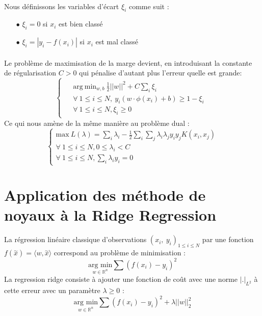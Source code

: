 \documentclass[a4paper,12pt,titlepage]{report}
\begin{document}
\paragraph{}
Nous définissons les variables d'écart $\xi_i$ comme suit :
\begin{itemize}
\item[$\bullet$]  $\xi_i = 0$ si $x_i$ est bien classé	  	  	 
\item[$\bullet$]  $\xi_i = |y_i - f(x_i)|$ si $x_i$ est mal classé	  
\end{itemize}	

\paragraph{}
Le problème de maximisation de la marge devient, en introduisant la constante de régularisation $C>0$ qui pénalise d'autant plus l'erreur quelle est grande: 
\[
	\left\{
	\begin{array}{ccc}		
	\begin{aligned}
		&\text{arg}\ \text{min}_{w,b}\ \frac{1}{2}||w||^{2} + C \sum_i {\xi_i} \\
		&\forall \ 1 \leqslant i \leqslant N,\ y_i (w \cdot \phi(x_i) + b)\geqslant 1 - \xi_i \\
		&\forall \ 1 \leqslant i \leqslant N, \xi_i \geqslant 0
	\end{aligned}
\end{array}
	\right.
\]
Ce qui nous amène de la même manière au problème dual :
\[
\left\{
\begin{array}{lll}
	\text{max}\ L(\lambda) = \sum_{i}{\lambda_{i}} - \frac{1}{2} \sum_{i}{\sum_{j}	{\lambda_{i} \lambda_{j} y_i y_j K(x_i,x_j)}} \\
 \forall \ 1 \leqslant i \leqslant N, 0 \leqslant \lambda_i < C \\
 \forall \ 1 \leqslant i \leqslant N, \sum_{i}\lambda_i y_i = 0 
\end{array}
\right.
\]
\section{Application des méthode de noyaux à la Ridge Regression}
La régression linéaire classique d'observations $(x_{i},\ y_{i})_{1 \leqslant i \leqslant N}$ par une fonction $f(\overset{\sim}{x}) = \langle w,\overset{\sim}{x}\rangle$ correspond au problème de minimisation :
\[
\underset{w \in \mathbb{R}^{n}}{\text{arg min}}\sum{(f(x_i) - y_i)^{2}}
\]
La regression ridge consiste à ajouter une fonction de coût avec une norme $|.|_{L^2}$ à cette erreur avec un paramètre $\lambda\geqslant 0 $ :
\[
\underset{w \in \mathbb{R}^{n}}{\text{arg min}}\sum{(f(x_i) - y_i)^{2}} +  \lambda ||w||_2^{2}
\]
\end{document}
